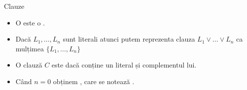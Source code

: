 \documentclass[xcolor=pdftex,romanian,colorlinks]{beamer}
\begin{document}
\begin{frame}{Clauze}

\begin{itemize}
\item  O  este o .

\medskip 

\item Dacă $L_1,\ldots, L_n$ sunt literali atunci putem reprezenta clauza
$L_1\vee\ldots\vee L_n$ ca mulțimea
$\{L_1,\ldots, L_n\}$

\begin{center}
\end{center}



\medskip 
\item O clauză $C$ este  dacă conține un literal și complementul lui. 

\medskip 
\item Când $n=0$ obținem , care se notează \intens{$\Box$}. 


%


\end{itemize}
 
\end{frame}






\end{document}
